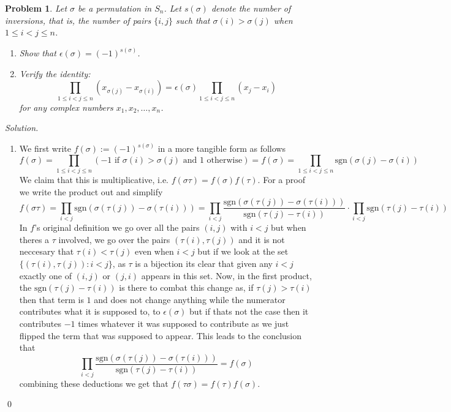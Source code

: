 \documentclass[12pt,a4paper]{article}
\newenvironment{solution}{%
  \par\noindent\textit{Solution.}\ }{\qed}
\theoremstyle{problemstyle}
\newtheorem{problem}{Problem}[section]
\def\sgn{\epsilon}
\def\sgn{\epsilon}
\begin{document}
\begin{problem}\label{prob:1.3}
    Let $\sigma$ be a permutation in $S_n$. Let $s(\sigma)$ denote the number of inversions, that is, the number of pairs $\{i, j\}$ such that $\sigma(i) > \sigma(j)$ when $1 \le i < j \le n$.
    \begin{enumerate}
        \item Show that $\epsilon(\sigma) = (-1)^{s(\sigma)}$.
        \item Verify the identity:
        \[
            \prod_{1 \le i < j \le n} (x_{\sigma(j)} - x_{\sigma(i)}) = \epsilon(\sigma) \prod_{1 \le i < j \le n} (x_j - x_i)
        \]
        for any complex numbers $x_1, x_2, \dots, x_n$.
    \end{enumerate}
\end{problem}
\begin{solution}
    \begin{enumerate}[\label=\arabic*.]
    \item
    We first write $f(\sigma):=(-1)^{s(\sigma)}$ in a more tangible form as follows
    $$f(\sigma)=\prod_{1\leq i<j\leq n}(-1\text{ if }\sigma(i)>\sigma(j)\text{ and }1\text{ otherwise})=f(\sigma)=\prod_{1\leq i<j\leq n}\text{sgn}(\sigma(j)-\sigma(i))$$
    We claim that this is multiplicative, i.e. $f(\sigma\tau)=f(\sigma)f(\tau).$ 
    For a proof we write the product out and simplify
    $$f(\sigma\tau)=\prod_{i<j}\text{sgn}(\sigma(\tau(j))-\sigma(\tau(i)))=\prod_{i<j}\frac{\text{sgn}(\sigma(\tau(j))-\sigma(\tau(i)))}{\text{sgn}(\tau(j)-\tau(i))}\cdot\prod_{i<j}\text{sgn}(\tau(j)-\tau(i))$$
    In $f$'s original definition we go over all the pairs $(i,j)$ with $i<j$ but when theres a $\tau$ involved, we go over the pairs $(\tau(i),\tau(j))$ and it is not neccesary that $\tau(i)<\tau(j)$ even when $i<j$ but if we look at the set $\{(\tau(i),\tau(j)):i<j\}$, as $\tau$ is a bijection its clear that given any $i<j$ exactly one of $(i,j)$ or $(j,i)$ appears in this set. 
    Now, in the first product, the $\text{sgn}(\tau(j)-\tau(i))$ is there to combat this change as, if $\tau(j)>\tau(i)$ then that term is $1$ and does not change anything while the numerator contributes what it is supposed to, to $\sgn(\sigma)$ but if thats not the case then it contributes $-1$ times whatever it was supposed to contribute as we just flipped the term that was supposed to appear. 
    This leads to the conclusion that 
    $$\prod_{i<j}\frac{\text{sgn}(\sigma(\tau(j))-\sigma(\tau(i)))}{\text{sgn}(\tau(j)-\tau(i))}=f(\sigma)$$
    combining these deductions we get that $f(\tau\sigma)=f(\tau)f(\sigma).$ 

\end{enumerate}
\end{solution}
\end{document}
